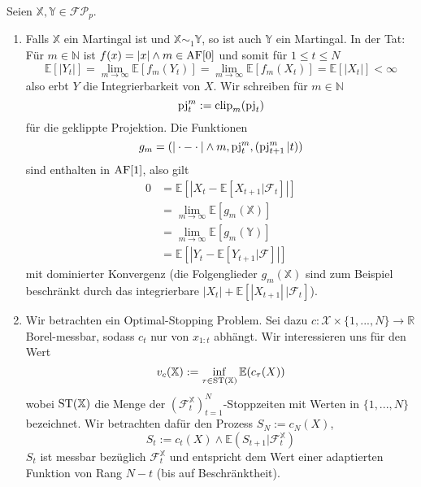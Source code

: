 \begin{example}\label{thm:adapted_examples}
    Seien $\mathbb{X,Y} \in\mathcal{FP}_p$.
    \begin{enumerate}
        \item Falls $\mathbb{X}$ ein Martingal ist und $\mathbb{X}\sim_1 \mathbb{Y}$, so ist auch $\mathbb{Y}$ ein Martingal. In der Tat: Für $m \in \mathbb{N}$ ist $f(x)= |x| \wedge m \in \operatorname{AF}[0]$ und somit für $1\leq t \leq N$
        $$\mathbb{E}[|Y_t|] = \lim_{m\rightarrow\infty}\mathbb{E}[f_m(Y_t)]=\lim_{m\rightarrow\infty}\mathbb{E}[f_m(X_t)] = \mathbb{E}[|X_t|] < \infty$$
        also erbt $Y$ die Integrierbarkeit von $X$. Wir schreiben für $m \in \mathbb{N}$ 
        $$\operatorname{pj}_t^m:=\operatorname{clip}_m(\operatorname{pj}_t)$$
         für die geklippte Projektion. Die Funktionen 
         $$g_m = (|\cdot - \cdot |\wedge m, \operatorname{pj}^m_t, (\operatorname{pj}^m_{t+1}\vert t))$$
         sind enthalten in $\operatorname{AF}[1]$, also gilt
         \begin{align*}
            0 &= \mathbb{E}\left[ |X_t - \mathbb{E}[X_{t+1} \vert \mathcal{F}_t]| \right] \\
            &= \lim_{m\rightarrow \infty} \mathbb{E}[g_m(\mathbb{X})] \\
            &= \lim_{m\rightarrow\infty} \mathbb{E}[g_m(\mathbb{Y})] \\
            &= \mathbb{E}\left[|Y_t - \mathbb{E}[Y_{t+1} \vert \mathcal{F}] |\right]
         \end{align*}
         mit dominierter Konvergenz (die Folgenglieder $g_m(\mathbb{X})$ sind zum Beispiel beschränkt durch das integrierbare $|X_t| + \mathbb{E}[|X_{t+1}| \,\vert \mathcal{F}_t]$).
         \item Wir betrachten ein Optimal-Stopping Problem. Sei dazu $c:\mathcal{X} \times \{1,...,N\}\rightarrow \mathbb{R}$ Borel-messbar, sodass $c_t$ nur von $x_{1:t}$ abhängt. Wir interessieren uns für den Wert 
         $$v_c(\mathbb{X}) := \inf\limits_{\tau \in \operatorname{ST}(\mathbb{X})}\mathbb{E}(c_\tau(X))$$
         wobei $\operatorname{ST}(\mathbb{X})$ die Menge der $\left(\mathcal{F}_t^\mathbb{X}\right)_{t=1}^N$-Stoppzeiten mit Werten in $\{1,...,N\}$ bezeichnet. Wir betrachten dafür den Prozess $S_N:=c_N(X)$, 
         \begin{equation} \label{eq:45_20}
            S_t := c_t(X) \wedge \mathbb{E}(S_{t+1} \vert \mathcal{F}_t^\mathbb{X})
         \end{equation}
         $S_t$ ist messbar bezüglich $\mathcal{F}_t^\mathbb{X}$ und entspricht dem Wert einer adaptierten Funktion von Rang $N-t$ (bis auf Beschränktheit).

\end{enumerate}
\end{example}
